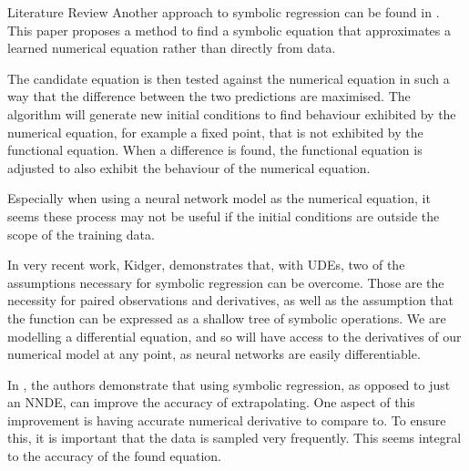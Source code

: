 \documentclass[12pt]{amsart}
\begin{document}
\begin{section}{Literature Review}
        Another approach to symbolic regression can be found in \cite{bongard2007automated}. This paper proposes a method to find a symbolic equation that approximates a learned numerical equation rather than directly from data. 
        
        The candidate equation is then tested against the numerical equation in such a way that the difference between the two predictions are maximised. The algorithm will generate new initial conditions to find behaviour exhibited by the numerical equation, for example a fixed point, that is not exhibited by the functional equation. When a difference is found, the functional equation is adjusted to also exhibit the behaviour of the numerical equation. 
        
        Especially when using a neural network model as the numerical equation, it seems these process may not be useful if the initial conditions are outside the scope of the training data.
        
        In very recent work, Kidger\cite{kidger2022neural}, demonstrates that, with UDEs, two of the assumptions necessary for symbolic regression can be overcome. Those are the necessity for paired observations and derivatives, as well as the assumption that the function can be expressed as a shallow tree of symbolic operations. We are modelling a differential equation, and so will have access to the derivatives of our numerical model at any point, as neural networks are easily differentiable. 

        In \cite{SciML_C_Rak}, the authors demonstrate that using symbolic regression, as opposed to just an NNDE, can improve the accuracy of extrapolating. One aspect of this improvement is having accurate numerical derivative to compare to. To ensure this, it is important that the data is sampled very frequently. This seems integral to the accuracy of the found equation. 
\end{section}
\end{document}
